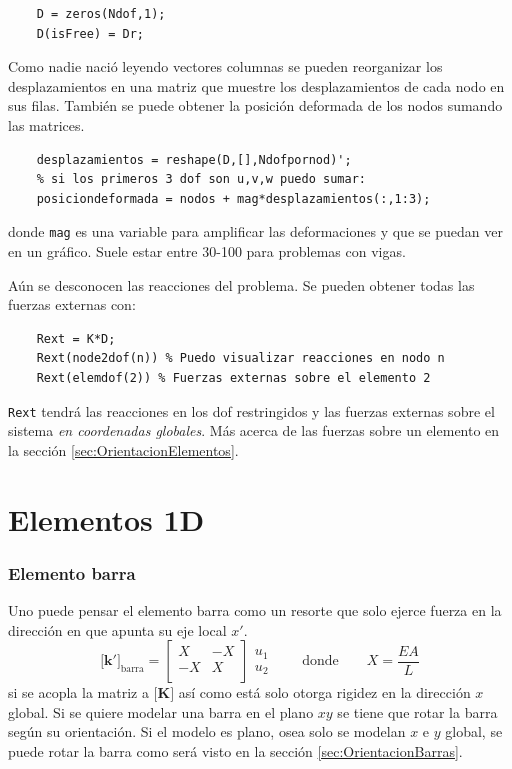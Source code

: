 \documentclass[11pt, a4paper,titlepage]{article}
\newcommand{\Mme}[1]{\boldsymbol{[}\mathbf{#1} \boldsymbol{]}}
\newcommand{\MK}{\Mme{K}}
\begin{document}
\begin{verbatim}
    D = zeros(Ndof,1);
    D(isFree) = Dr;
\end{verbatim}

Como nadie nació leyendo vectores columnas se pueden reorganizar los desplazamientos en una matriz que muestre los desplazamientos de cada nodo en sus filas. También se puede obtener la posición deformada de los nodos sumando las matrices.
\begin{verbatim}
    desplazamientos = reshape(D,[],Ndofpornod)';
    % si los primeros 3 dof son u,v,w puedo sumar:
    posiciondeformada = nodos + mag*desplazamientos(:,1:3); 
\end{verbatim}
 donde \texttt{mag} es una variable para amplificar las deformaciones y que se puedan ver en un gráfico. Suele estar entre 30-100 para problemas con vigas.

Aún se desconocen las reacciones del problema. Se pueden obtener todas las fuerzas externas con:
\begin{verbatim}
    Rext = K*D;
    Rext(node2dof(n)) % Puedo visualizar reacciones en nodo n
    Rext(elemdof(2)) % Fuerzas externas sobre el elemento 2
\end{verbatim}
\texttt{Rext} tendrá las reacciones en los dof restringidos y las fuerzas externas sobre el sistema \textit{en coordenadas globales}. Más acerca de las fuerzas sobre un elemento en la sección \ref{sec:OrientacionElementos}.


\part{Elementos 1D}

\section{Elemento barra}
Uno puede pensar el elemento barra como un resorte que solo ejerce fuerza en la dirección en que apunta su eje local $x'$.
\begin{equation} \label{eq:matrizBarra}
\Mme{k'}_{\mathrm{barra}} = \begin{bmatrix}
X & -X \\ 
-X & X\\
\end{bmatrix}\begin{array}{c}
u_1\\
u_2 
\end{array} \qquad \text{donde}\qquad X=\frac{EA}{L}
\end{equation}
si se acopla la matriz a $\MK$ así como está solo otorga rigidez en la dirección $x$ global. Si se quiere modelar una barra en el plano $xy$ se tiene que rotar la barra según su orientación. Si el modelo es plano, osea solo se modelan $x$ e $y$ global, se puede rotar la barra como será visto en la sección \ref{sec:OrientacionBarras}. 
\end{document}
